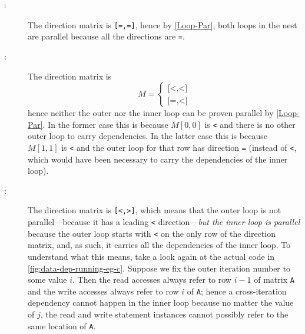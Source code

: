 \begin{description}
\item[:] The direction matrix is
  \texttt{[=,=]}, hence by \cref{Loop-Par}, both loops in the nest are
  parallel because all the directions are \texttt{=}.

\item[:] The direction matrix is
  \[
    M = \begin{cases}\texttt{[<,<]}\\\texttt{[=,<]}\end{cases}
  \]
  hence neither the outer nor the inner loop can be proven parallel by
  \cref{Loop-Par}. In the former case this is because $M[0,0]$ is
  \texttt{<} and there is no other outer loop to carry
  dependencies. In the latter case this is because $M[1,1]$ is
  \texttt{<} and the outer loop for that row has direction \texttt{=}
  (instead of \texttt{<}, which would have been necessary to carry the
  dependencies of the inner loop).

\item[:] The direction matrix is
  \texttt{[<,>]}, which means that the outer loop is not
  parallel---because it has a leading \texttt{<} direction---\emph{but
    the inner loop is parallel} because the outer loop starts with
  \texttt{<} on the only row of the direction matrix, and, as such, it
  carries all the dependencies of the inner loop.  To understand what
  this means, take a look again at the actual code in
  \cref{fig:data-dep-running-eg-c}.  Suppose we fix the outer
  iteration number to some value $i$. Then the read accesses always
  refer to row $i-1$ of matrix \texttt{A} and the write accesses
  always refer to row $i$ of \texttt{A}; hence a cross-iteration
  dependency cannot happen in the inner loop because no matter the
  value of $j$, the read and write statement instances cannot possibly
  refer to the same location of \texttt{A}.
\end{description}

